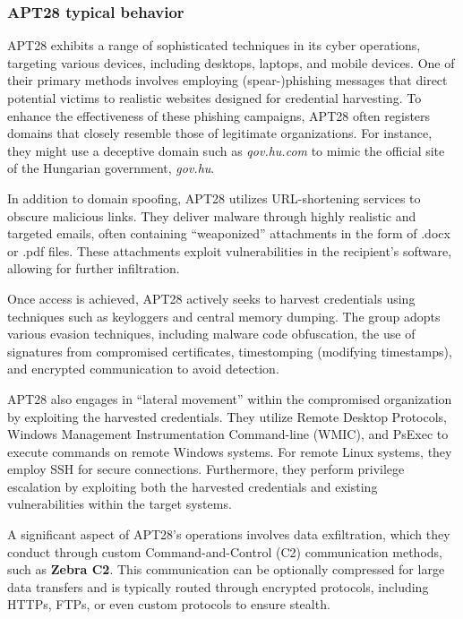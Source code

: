 \subsubsection{APT28 typical behavior}


APT28 exhibits a range of sophisticated techniques in its cyber
operations, targeting various devices, including desktops, laptops,
and mobile devices. One of their primary methods involves employing
(spear-)phishing messages that direct potential victims to realistic
websites designed for credential harvesting. To enhance the
effectiveness of these phishing campaigns, APT28 often registers
domains that closely resemble those of legitimate organizations. For
instance, they might use a deceptive domain such as
\textit{qov.hu.com} to mimic the official site of the Hungarian
government, \textit{gov.hu}.

In addition to domain spoofing, APT28 utilizes URL-shortening services
to obscure malicious links. They deliver malware through highly
realistic and targeted emails, often containing “weaponized”
attachments in the form of .docx or .pdf files. These attachments
exploit vulnerabilities in the recipient’s software, allowing for
further infiltration.

Once access is achieved, APT28 actively seeks to harvest credentials
using techniques such as keyloggers and central memory dumping. The
group adopts various evasion techniques, including malware code
obfuscation, the use of signatures from compromised certificates,
timestomping (modifying timestamps), and encrypted communication to
avoid detection.

APT28 also engages in “lateral movement” within the compromised
organization by exploiting the harvested credentials. They utilize
Remote Desktop Protocols, Windows Management Instrumentation
Command-line (WMIC), and PsExec to execute commands on remote Windows
systems. For remote Linux systems, they employ SSH for secure
connections. Furthermore, they perform privilege escalation by
exploiting both the harvested credentials and existing vulnerabilities
within the target systems.

A significant aspect of APT28's operations involves data exfiltration,
which they conduct through custom Command-and-Control (C2)
communication methods, such as \textbf{Zebra C2}. This communication
can be optionally compressed for large data transfers and is typically
routed through encrypted protocols, including HTTPs, FTPs, or even
custom protocols to ensure stealth.

